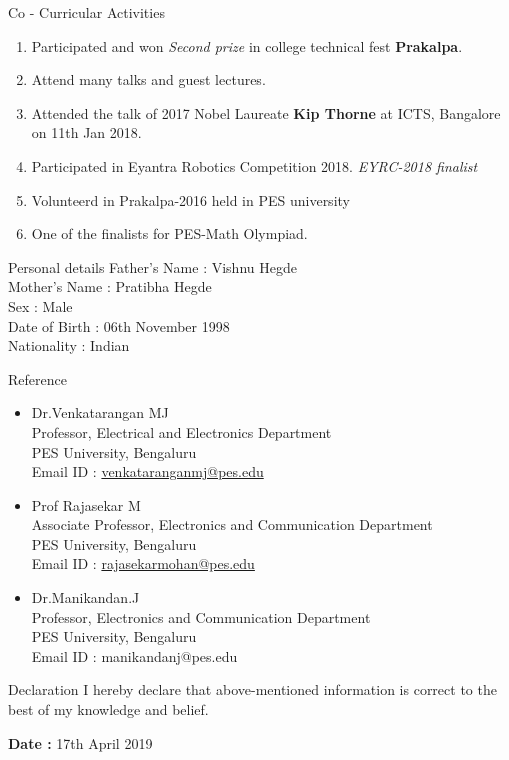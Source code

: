 \documentclass{resume} %
\begin{document}
\vspace{1cm}



\begin{rSection}{Co - Curricular Activities}
\begin{enumerate}
    \item Participated and won \textit{Second prize} in college technical fest {\bf Prakalpa}.
    \item Attend many talks and guest lectures.
    \item Attended the talk of 2017 Nobel Laureate {\bf Kip Thorne} at ICTS, Bangalore on 11th Jan 2018.
    \item Participated in Eyantra Robotics Competition 2018. \textit{EYRC-2018 finalist} 
    \item Volunteerd in Prakalpa-2016 held in PES university
    \item One of the finalists for PES-Math Olympiad.
\end{enumerate}
\end{rSection}



\begin{rSection}{Personal details}
Father's Name : Vishnu Hegde \\
Mother's Name : Pratibha Hegde \\
Sex : Male \\
Date of Birth : 06th November 1998 \\
Nationality : Indian \\

\end{rSection}





\begin{rSection}{Reference}
\begin{itemize}

	\item Dr.Venkatarangan MJ\\
		Professor, Electrical and Electronics Department\\
		PES University, Bengaluru\\
		Email ID : \href{http://13.232.26.175/p10106}{venkataranganmj@pes.edu} \\

	\item Prof Rajasekar M\\
		Associate Professor, Electronics and Communication Department\\
		PES University, Bengaluru\\
		Email ID :  \href{https://faculty.pes.edu/p10125}{rajasekarmohan@pes.edu} \\
		
	\item Dr.Manikandan.J\\
		Professor, Electronics and Communication Department\\
		PES University, Bengaluru\\
		Email ID : manikandanj@pes.edu 
\end{itemize}
\end{rSection}


\begin{rSection}{Declaration}
I hereby declare that above-mentioned information is correct to the best of my knowledge and belief. \\
\end{rSection}

{\bf Date : } 17th April 2019
\end{document}
